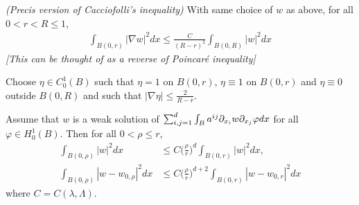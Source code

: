 \documentclass[12pt,a4paper]{article}
\newenvironment{proof}
{\begin{changemargin}{0.5cm}{0.5cm} 
	}%
	{\end{changemargin}
}
\newenvironment{p}
{\begin{proof} 
	}%
	{\end{proof}
}
\begin{document}
\corr \emph{(Precis version of Cacciofolli's inequality)} With same choice of $w$ as above, for all $0<r<R\leq 1$,
\begin{align*}
\int_{B(0,r)} |\nabla w|^2 dx \leq \frac{C}{(R-r)^2} \int_{B(0,R)} |w|^2 dx
\end{align*}
\emph{[This can be thought of as a reverse of Poincar\'e inequality]}
\begin{p}
\pf Choose $\eta \in C_0^1(B)$ such that $\eta =1$ on $B(0, r)$, $\eta \equiv 1$ on $B(0, r)$ and $\eta \equiv 0$ outside $B(0, R)$ and such that $|\nabla \eta| \leq \frac{2}{R-r}$.

\eop
\end{p}
\s

\prop Assume that $w$ is a weak solution of $\sum_{i,j=1}^d \int_B a^{ij} \partial_{x_i} w \partial_{x_j} \varphi dx$ for all $\varphi \in H_0^1(B)$. Then for all  $0< \rho \leq r$, 
\begin{align*}
\int_{B(0, \rho)} |w|^2 dx &\leq C\big( \frac{\rho}{r} \big)^d \int_{B(0, r)} |w|^2 dx,\\
\int_{B(0, \rho)} |w - w_{0, \rho}|^2 dx &\leq C \big(\frac{\rho}{r} \big)^{d+2} \int_{B(0,r)} |w- w_{0,r}|^2 dx
\end{align*}
where $C= C(\lambda, \Lambda)$.
\end{document}
